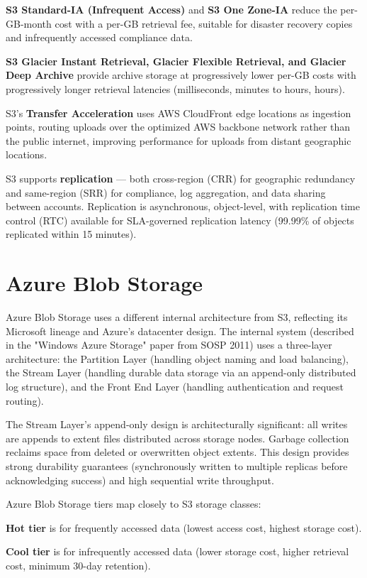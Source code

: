 \textbf{S3 Standard-IA (Infrequent Access)} and \textbf{S3 One Zone-IA} reduce the per-GB-month cost with a per-GB retrieval fee, suitable for disaster recovery copies and infrequently accessed compliance data.

\textbf{S3 Glacier Instant Retrieval, Glacier Flexible Retrieval, and Glacier Deep Archive} provide archive storage at progressively lower per-GB costs with progressively longer retrieval latencies (milliseconds, minutes to hours, hours).

S3's \textbf{Transfer Acceleration} uses AWS CloudFront edge locations as ingestion points, routing uploads over the optimized AWS backbone network rather than the public internet, improving performance for uploads from distant geographic locations.

S3 supports \textbf{replication} --- both cross-region (CRR) for geographic redundancy and same-region (SRR) for compliance, log aggregation, and data sharing between accounts. Replication is asynchronous, object-level, with replication time control (RTC) available for SLA-governed replication latency (99.99\% of objects replicated within 15 minutes).

\section{Azure Blob Storage}
Azure Blob Storage uses a different internal architecture from S3, reflecting its Microsoft lineage and Azure's datacenter design. The internal system (described in the "Windows Azure Storage" paper from SOSP 2011) uses a three-layer architecture: the Partition Layer (handling object naming and load balancing), the Stream Layer (handling durable data storage via an append-only distributed log structure), and the Front End Layer (handling authentication and request routing).

The Stream Layer's append-only design is architecturally significant: all writes are appends to extent files distributed across storage nodes. Garbage collection reclaims space from deleted or overwritten object extents. This design provides strong durability guarantees (synchronously written to multiple replicas before acknowledging success) and high sequential write throughput.

Azure Blob Storage tiers map closely to S3 storage classes:

\textbf{Hot tier} is for frequently accessed data (lowest access cost, highest storage cost).

\textbf{Cool tier} is for infrequently accessed data (lower storage cost, higher retrieval cost, minimum 30-day retention).

